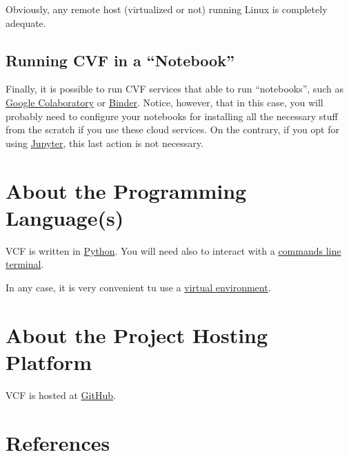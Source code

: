 Obviously, any remote host (virtualized or not) running Linux is
completely adequate.

\subsection{Running CVF in a ``Notebook''}
Finally, it is possible to run CVF services that able to run
``notebooks'', such as
\href{https://colab.research.google.com/}{Google Colaboratory} or
\href{https://mybinder.org/}{Binder}. Notice, however, that in this
case, you will probably need to configure your notebooks for
installing all the necessary stuff from the scratch if you use these
cloud services. On the contrary, if you opt for using
\href{https://jupyter.org/}{Jupyter}, this last action is not
necessary.

\section{About the Programming Language(s)}

VCF is written in \href{https://www.python.org/}{Python}. You will need
also to interact with
a \href{https://en.wikipedia.org/wiki/Command-line_interface}{commands
  line terminal}.

In any case, it is very convenient tu use a
\href{https://docs.python.org/3/library/venv.html}{virtual
  environment}.

\section{About the Project Hosting Platform}

VCF is hosted at \href{https://github.com}{GitHub}.

\section{References}

\renewcommand{\addcontentsline}[3]{}%

